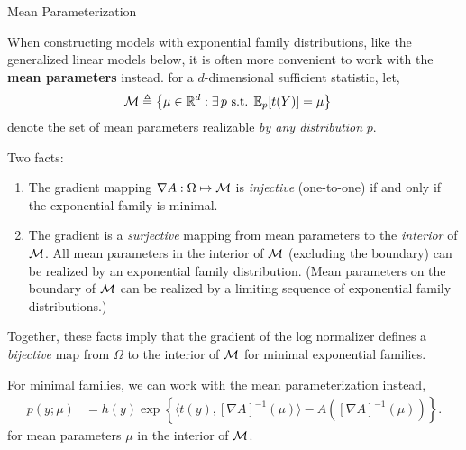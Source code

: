 \documentclass[aspectratio=169]{beamer}
\begin{document}
\begin{frame}[t,allowframebreaks]{Mean Parameterization}\label{mean-parameterization}

When constructing models with exponential family distributions, like the
generalized linear models below, it is often more convenient to work
with the \textbf{mean parameters} instead. for a \(d\)-dimensional
sufficient statistic, let, \begin{align*}
\mathcal{M} &\triangleq \left\{ \mu \in \mathbb{R}^d : \exists \, p \text{ s.t. } \mathbb{E}_p[t(Y)] = \mu \right\}
\end{align*} denote the set of mean parameters realizable \emph{by any
distribution} \(p\).

Two facts: 
\begin{enumerate}
    \item The gradient mapping \(\nabla A: \Omega \mapsto \mathcal{M}\) is
\emph{injective} (one-to-one) if and only if the exponential family is
minimal. 
    \item The gradient is a \emph{surjective} mapping from mean
parameters to the \emph{interior} of \(\mathcal{M}\). All mean parameters in the
interior of \(\mathcal{M}\) (excluding the boundary) can be realized by an
exponential family distribution. (Mean parameters on the boundary of
\(\mathcal{M}\) can be realized by a limiting sequence of exponential family
distributions.)
\end{enumerate}

Together, these facts imply that the gradient of the log normalizer
defines a \emph{bijective} map from \(\Omega\) to the interior of
\(\mathcal{M}\) for minimal exponential families.

For minimal families, we can work with the mean parameterization
instead, 
\begin{align*}
p(y; \mu) 
&= h(y) \exp \left\{ \langle t(y), [\nabla A]^{-1}(\mu) \rangle - A([\nabla A]^{-1}(\mu)) \right\}.
\end{align*} 
for mean parameters \(\mu\) in the interior of \(\mathcal{M}\).
\end{frame}
\end{document}
